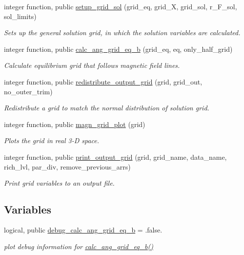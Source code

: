 \begin{DoxyCompactItemize}
integer function, public \hyperlink{namespacegrid__ops_aeff1569cb9a043b03ed49250524fbd95}{setup\+\_\+grid\+\_\+sol} (grid\+\_\+eq, grid\+\_\+X, grid\+\_\+sol, r\+\_\+\+F\+\_\+sol, sol\+\_\+limits)
\begin{DoxyCompactList}\small\item\em Sets up the general solution grid, in which the solution variables are calculated. \end{DoxyCompactList}\item 
integer function, public \hyperlink{namespacegrid__ops_a06107dbdfd1dd62e372cc29ab0255bad}{calc\+\_\+ang\+\_\+grid\+\_\+eq\+\_\+b} (grid\+\_\+eq, eq, only\+\_\+half\+\_\+grid)
\begin{DoxyCompactList}\small\item\em Calculate equilibrium grid that follows magnetic field lines. \end{DoxyCompactList}\item 
integer function, public \hyperlink{namespacegrid__ops_ab10ef5b486ee3861df2da4e53bc22630}{redistribute\+\_\+output\+\_\+grid} (grid, grid\+\_\+out, no\+\_\+outer\+\_\+trim)
\begin{DoxyCompactList}\small\item\em Redistribute a grid to match the normal distribution of solution grid. \end{DoxyCompactList}\item 
integer function, public \hyperlink{namespacegrid__ops_addd76b7b3be0b51e0863ae0cdfef41e6}{magn\+\_\+grid\+\_\+plot} (grid)
\begin{DoxyCompactList}\small\item\em Plots the grid in real 3-\/D space. \end{DoxyCompactList}\item 
integer function, public \hyperlink{namespacegrid__ops_a4827e794d37334c0cad9bb2016e64d46}{print\+\_\+output\+\_\+grid} (grid, grid\+\_\+name, data\+\_\+name, rich\+\_\+lvl, par\+\_\+div, remove\+\_\+previous\+\_\+arrs)
\begin{DoxyCompactList}\small\item\em Print grid variables to an output file. \end{DoxyCompactList}\end{DoxyCompactItemize}
\subsection*{Variables}
\begin{DoxyCompactItemize}
\item 
logical, public \hyperlink{namespacegrid__ops_ad043ab1b07b2d251bb7596b8c8d2f960}{debug\+\_\+calc\+\_\+ang\+\_\+grid\+\_\+eq\+\_\+b} = .false.
\begin{DoxyCompactList}\small\item\em plot debug information for \hyperlink{namespacegrid__ops_a06107dbdfd1dd62e372cc29ab0255bad}{calc\+\_\+ang\+\_\+grid\+\_\+eq\+\_\+b()} \end{DoxyCompactList}\end{DoxyCompactItemize}


